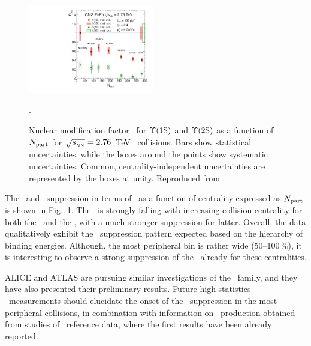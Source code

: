 \begin{figure}[!ht]
\begin{center}
   \includegraphics[width=0.49\textwidth]{quarkoniafigs/RaaPt4.pdf}
   \label{fig:KS:centrality}
  \caption{
Nuclear modification factor \Raa\ for $\Upsilon\mathrm{(1S)}$ and $\Upsilon\mathrm{(2S)}$ as a function of $N_{\rm part}$ for $\sqrt{s_{_{\rm NN}}} = 2.76$~TeV \PbPb\ collisions. Bars show statistical uncertainties, while the boxes around the points show systematic uncertainties. Common, centrality-independent uncertainties are represented by the boxes at unity. Reproduced from~\cite{Chatrchyan:2012lxa}}.
\end{center}
\end{figure}

The \PgUa\ and \PgUb\ suppression in terms of \Raa\ as a function of centrality expressed as $N_{\rm part}$
is shown in Fig.~\ref{fig:KS:centrality}.
The \Raa\ is strongly falling with increasing collision centrality
for both the \PgUa\ and the \PgUb, with a much stronger suppression for latter.
Overall, the data qualitatively exhibit the \PgUn\ suppression pattern
expected based on the hierarchy of binding energies. Although, the most peripheral bin
is rather wide (50--100\,\%), it is interesting to observe a strong suppression of the
\PgUb\ already for these centralities. 

ALICE and ATLAS are pursuing similar investigations of the \PgU\ family, and they have also presented their preliminary results.
Future high statistics \PbPb\ measurements
should elucidate the onset of the \PgU\ suppression in the most peripheral collisions,
in combination with information on \PgU\ production obtained from
studies of \pPb\ reference data, where the first results have been already reported.


